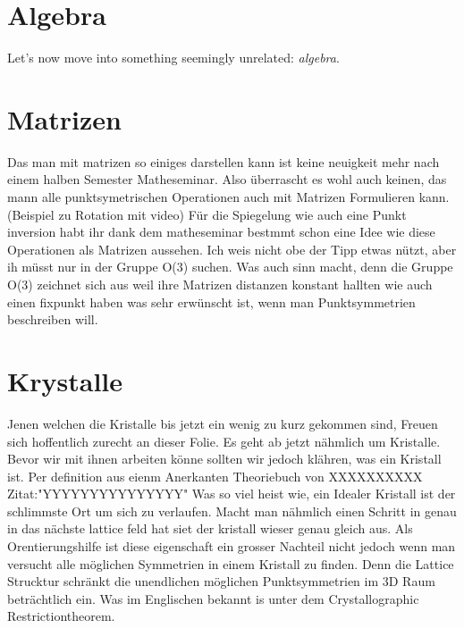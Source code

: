 \documentclass[a4paper]{article}
\newcommand{\scene}[1]{\par\noindent[ #1 ]\par}
\newenvironment{totranslate}{\color{blue!70!black}}{}
\begin{document}
\section{Algebra}
\begin{totranslate}
Let's now move into something seemingly unrelated: \emph{algebra}.
\scene{Complex numbers and cyclic groups}
\end{totranslate}

\section{Matrizen}
  Das man mit matrizen so einiges darstellen kann ist keine neuigkeit mehr nach einem halben Semester Matheseminar. 
  Also überrascht es wohl auch keinen, das mann alle punktsymetrischen Operationen auch mit Matrizen Formulieren kann.
  (Beispiel zu Rotation mit video)
  Für die Spiegelung wie auch eine Punkt inversion habt ihr dank dem matheseminar bestmmt schon eine Idee wie diese Operationen als Matrizen aussehen.
  Ich weis nicht obe der Tipp etwas nützt, aber ih müsst nur in der Gruppe O(3) suchen. 
  Was auch sinn macht, denn die Gruppe O(3) zeichnet sich aus weil ihre Matrizen distanzen konstant hallten wie auch einen fixpunkt haben was sehr erwünscht ist, wenn man Punktsymmetrien beschreiben will.



\section{Krystalle}
  Jenen welchen die Kristalle bis jetzt ein wenig zu kurz gekommen sind, Freuen sich hoffentlich zurecht an dieser Folie.
  Es geht ab jetzt nähmlich um Kristalle. 
  Bevor wir mit ihnen arbeiten könne sollten wir jedoch klähren, was ein Kristall ist. 
  Per definition aus eienm Anerkanten Theoriebuch von XXXXXXXXXX Zitat:"YYYYYYYYYYYYYYY"
  Was so viel  heist wie, ein Idealer Kristall ist der schlimmste Ort um sich zu verlaufen.
  Macht man nähmlich einen Schritt in genau in das nächste lattice feld hat siet der kristall wieser genau gleich aus. 
  Als Orentierungshilfe ist diese eigenschaft ein grosser Nachteil nicht jedoch wenn man versucht alle möglichen Symmetrien in einem Kristall zu finden.
  Denn die Lattice Strucktur schränkt die unendlichen möglichen Punktsymmetrien im 3D Raum beträchtlich ein. 
  Was im Englischen bekannt is unter dem Crystallographic Restrictiontheorem.  
  
\end{document}
